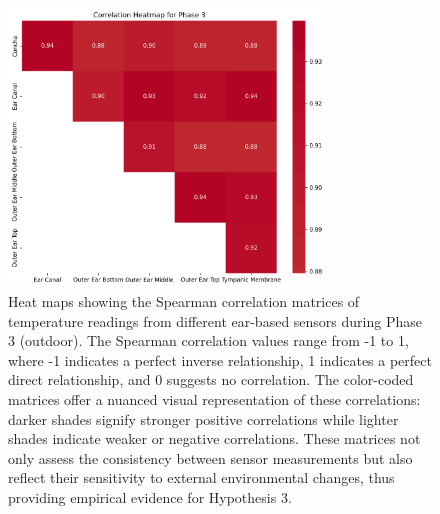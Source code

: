 \begin{figure}[!t]
    \centering
    \includegraphics[width=0.75\textwidth]{thesis-doc/images/study1/hypothesis3/Correlation_Heatmap_Phase_3.png}
    \caption{Heat maps showing the Spearman correlation matrices of temperature readings from different ear-based sensors during Phase 3 (outdoor). The Spearman correlation values range from -1 to 1, where -1 indicates a perfect inverse relationship, 1 indicates a perfect direct relationship, and 0 suggests no correlation. The color-coded matrices offer a nuanced visual representation of these correlations: darker shades signify stronger positive correlations while lighter shades indicate weaker or negative correlations. These matrices not only assess the consistency between sensor measurements but also reflect their sensitivity to external environmental changes, thus providing empirical evidence for Hypothesis 3.}    
    \label{fig:eval:study1:hypothesis3_result}
\end{figure}

